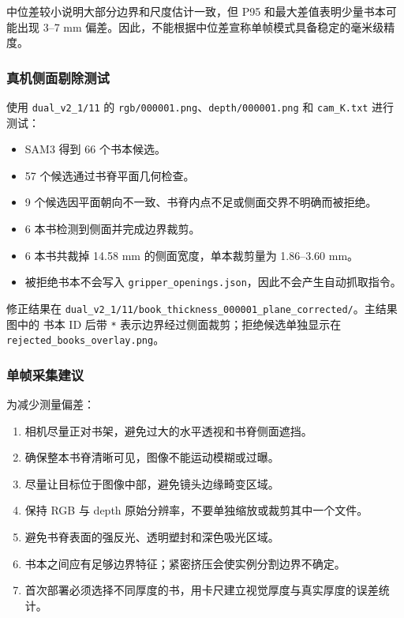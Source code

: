 \documentclass[
  chinese,
  11pt,
  a4paper,
]{article}
\providecommand{\tightlist}{%
  \setlength{\itemsep}{0pt}\setlength{\parskip}{0pt}}
\begin{document}
中位差较小说明大部分边界和尺度估计一致，但 P95
和最大差值表明少量书本可能出现 3--7 mm
偏差。因此，不能根据中位差宣称单帧模式具备稳定的毫米级精度。

\subsubsection{真机侧面剔除测试}\label{ux771fux673aux4fa7ux9762ux5254ux9664ux6d4bux8bd5}

使用 \texttt{dual\_v2\_1/11} 的
\texttt{rgb/000001.png}、\texttt{depth/000001.png} 和
\texttt{cam\_K.txt} 进行测试：

\begin{itemize}
\tightlist
\item
  SAM3 得到 66 个书本候选。
\item
  57 个候选通过书脊平面几何检查。
\item
  9 个候选因平面朝向不一致、书脊内点不足或侧面交界不明确而被拒绝。
\item
  6 本书检测到侧面并完成边界裁剪。
\item
  6 本书共裁掉 14.58 mm 的侧面宽度，单本裁剪量为 1.86--3.60 mm。
\item
  被拒绝书本不会写入
  \texttt{gripper\_openings.json}，因此不会产生自动抓取指令。
\end{itemize}

修正结果在
\texttt{dual\_v2\_1/11/book\_thickness\_000001\_plane\_corrected/}。主结果图中的
书本 ID 后带 \texttt{*} 表示边界经过侧面裁剪；拒绝候选单独显示在
\texttt{rejected\_books\_overlay.png}。

\subsubsection{单帧采集建议}\label{ux5355ux5e27ux91c7ux96c6ux5efaux8bae}

为减少测量偏差：

\begin{enumerate}
\def\labelenumi{\arabic{enumi}.}
\tightlist
\item
  相机尽量正对书架，避免过大的水平透视和书脊侧面遮挡。
\item
  确保整本书脊清晰可见，图像不能运动模糊或过曝。
\item
  尽量让目标位于图像中部，避免镜头边缘畸变区域。
\item
  保持 RGB 与 depth 原始分辨率，不要单独缩放或裁剪其中一个文件。
\item
  避免书脊表面的强反光、透明塑封和深色吸光区域。
\item
  书本之间应有足够边界特征；紧密挤压会使实例分割边界不确定。
\item
  首次部署必须选择不同厚度的书，用卡尺建立视觉厚度与真实厚度的误差统计。
\end{enumerate}
\end{document}
